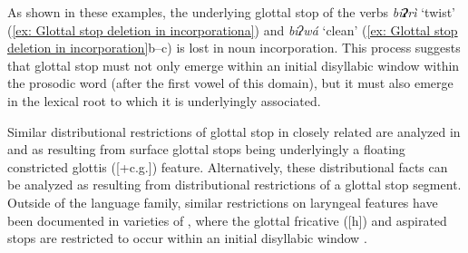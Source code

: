     \label{ex: Glottal stop deletion in incorporationa}
        \label{ex: Glottal stop deletion in incorporationb}
            \label{ex: Glottal stop deletion in incorporationc}
    \z
\z

As shown in these examples, the underlying glottal stop of the verbs \textit{bi\textbf{ʔ}rì} `twist' (\ref{ex: Glottal stop deletion in incorporationa}) and \textit{biʔwá} ‘clean’ (\ref{ex: Glottal stop deletion in incorporation}b--c) is lost in noun incorporation. This process suggests that glottal stop must not only emerge within an initial disyllabic window within the prosodic word (after the first vowel of this domain), but it must also emerge in the lexical root to which it is underlyingly associated.

Similar distributional restrictions of glottal stop in closely related  are analyzed in \citet{caballero2006templatic} and \citet{haugen2014laryngeals} as resulting from surface glottal stops being underlyingly a floating constricted glottis ([+c.g.]) feature. Alternatively, these distributional facts can be analyzed as resulting from distributional restrictions of a glottal stop segment. Outside of the  language family, similar restrictions on laryngeal features have been documented in varieties of , where the glottal fricative ([h]) and aspirated stops are restricted to occur within an initial disyllabic window \citep{hualde2018aspiration}.


